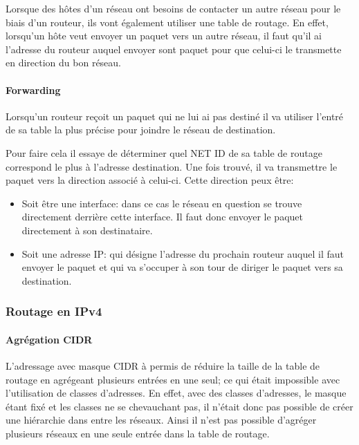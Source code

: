 Lorsque des hôtes d'un réseau ont besoins de contacter un autre réseau pour le
biais d'un routeur, ils vont également utiliser une table de routage.  En
effet, lorsqu'un hôte veut envoyer un paquet vers un autre réseau, il faut
qu'il ai l'adresse du routeur auquel envoyer sont paquet pour que celui-ci le
transmette en direction du bon réseau.

\paragraph{Forwarding}

Lorsqu'un routeur reçoit un paquet qui ne lui ai pas destiné il va utiliser
l'entré de sa table la plus précise pour joindre le réseau de destination.

Pour faire cela il essaye de déterminer quel NET ID de sa table de routage
correspond le plus à l'adresse destination.  Une fois trouvé, il va transmettre
le paquet vers la direction associé à celui-ci.
Cette direction peux être:
\begin{itemize}
\item Soit être une interface: dans ce cas le réseau en question se trouve
directement derrière cette interface. Il faut donc envoyer le paquet
directement à son destinataire.
\item Soit une adresse IP: qui désigne l'adresse du prochain routeur auquel il
faut envoyer le paquet et qui va s'occuper à son tour de diriger le paquet vers
sa destination.
\end{itemize}

\subsubsection{Routage en IPv4}
\paragraph{Agrégation CIDR}
L'adressage avec masque CIDR à permis de réduire la taille de la table de
routage en agrégeant plusieurs entrées en une seul; ce qui était impossible avec
l'utilisation de classes d'adresses.  En effet, avec des classes d'adresses, le
masque étant fixé et les classes ne se chevauchant pas, il n'était donc pas
possible de créer une hiérarchie dans entre les réseaux.  Ainsi il n'est pas
possible d'agréger plusieurs réseaux en une seule entrée dans la table de
routage.

